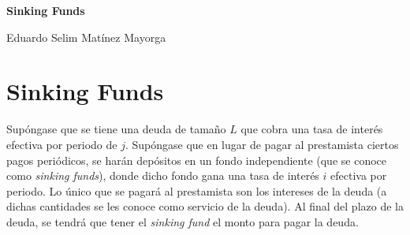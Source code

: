





\begin{titlingpage} %

    \raggedleft %
	
	\vspace*{\baselineskip} %
	
	\vspace*{0.25\textheight} %
	
    
    \vspace*{0.1\textheight}

    {\Huge{\textbf{Sinking Funds}}}\\[\baselineskip] %
    \vspace*{0.1\textheight}

    
    {\Large Eduardo Selim Matínez Mayorga}\\[\baselineskip]
	
	\vfill

\end{titlingpage}

\thispagestyle{empty}

\chapter*{Sinking Funds}
Supóngase que se tiene una deuda de tamaño $L$ que cobra una tasa de interés efectiva por periodo de $j$. Supóngase que en lugar de pagar al prestamista ciertos pagos periódicos, se harán depósitos en un fondo independiente (que se conoce como \textit{sinking funds}), donde dicho fondo gana una tasa de interés $i$ efectiva por periodo. Lo único que se pagará al prestamista son los intereses de la deuda (a dichas cantidades se les conoce como servicio de la deuda). Al final del plazo de la deuda, se tendrá que tener el \textit{sinking fund} el monto para pagar la deuda.\\

